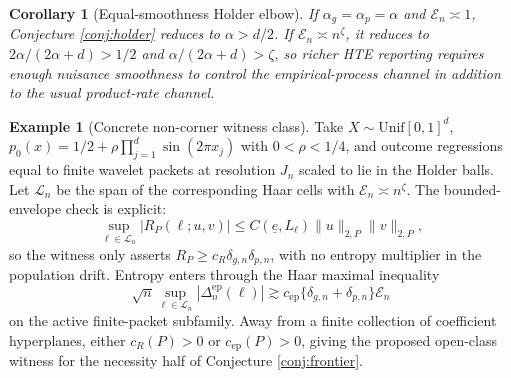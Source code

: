 \documentclass[11pt]{article}
\theoremstyle{definition}
\newtheorem{example}{Example}
\theoremstyle{plain}
\newtheorem{corollary}{Corollary}
\theoremstyle{remark}
\begin{document}
\begin{corollary}[Equal-smoothness Holder elbow]\label{cor:equal-holder}
If \(\alpha_g=\alpha_p=\alpha\) and \(\mathcal{E}_n\asymp1\), Conjecture
\ref{conj:holder} reduces to \(\alpha>d/2\).  If
\(\mathcal{E}_n\asymp n^\zeta\), it reduces to
\(2\alpha/(2\alpha+d)>1/2\) and \(\alpha/(2\alpha+d)>\zeta\), so richer HTE
reporting requires enough nuisance smoothness to control the empirical-process
channel in addition to the usual product-rate channel.
\end{corollary}

\begin{example}[Concrete non-corner witness class]\label{ex:witness}
Take \(X\sim \mathrm{Unif}[0,1]^d\), \(p_0(x)=1/2+\rho\prod_{j=1}^d
\sin(2\pi x_j)\) with \(0<\rho<1/4\), and outcome regressions equal to
finite wavelet packets at resolution \(J_n\) scaled to lie in the Holder balls.
Let \(\mathcal{L}_n\) be the span of the corresponding Haar cells with
\(\mathcal{E}_n\asymp n^\zeta\).  The bounded-envelope check is explicit:
\[
\sup_{\ell\in\mathcal{L}_n}|R_P(\ell;u,v)|
\le C(\underline e,L_\ell)\|u\|_{2,P}\|v\|_{2,P},
\]
so the witness only asserts \(R_P\ge c_R\delta_{g,n}\delta_{p,n}\), with no
entropy multiplier in the population drift.  Entropy enters through the Haar
maximal inequality
\[
\sqrt n\sup_{\ell\in\mathcal{L}_n}|\Delta^{\mathrm{ep}}_n(\ell)|
\gtrsim c_{\mathrm{ep}}\{\delta_{g,n}+\delta_{p,n}\}\mathcal{E}_n
\]
on the active finite-packet subfamily.  Away from a finite collection of
coefficient hyperplanes, either \(c_R(P)>0\) or \(c_{\mathrm{ep}}(P)>0\), giving
the proposed open-class witness for the necessity half of Conjecture
\ref{conj:frontier}.
\end{example}
\end{document}
